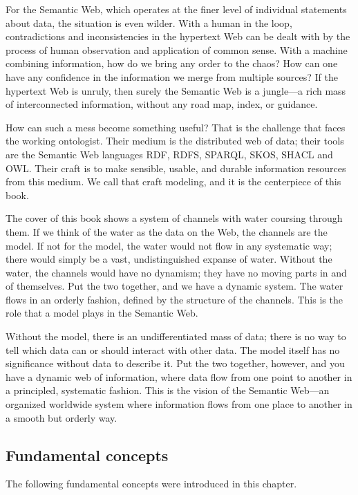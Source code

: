 For the Semantic Web, which operates at the finer level of individual
statements about data, the situation is even wilder. With a human in the
loop, contradictions and inconsistencies in the hypertext Web can be
dealt with by the process of human observation and application of common
sense. With a machine combining information, how do we bring any order
to the chaos? How can one have any confidence in the information we
merge from multiple sources? If the hypertext Web is unruly, then surely
the Semantic Web is a jungle---a rich mass of interconnected
information, without any road map, index, or guidance.

How can such a mess become something useful? That is the challenge that
faces the working ontologist. Their medium is the distributed web of
data; their tools are the Semantic Web languages RDF, RDFS, SPARQL,
SKOS, SHACL and OWL. Their craft is to make sensible, usable, and
durable information resources from this medium. We call that craft
modeling, and it is the centerpiece of this book.

The cover of this book shows a system of channels with water coursing
through them. If we think of the water as the data on the Web, the
channels are the model. If not for the model, the water would not flow
in any systematic way; there would simply be a vast, undistinguished
expanse of water. Without the water, the channels would have no
dynamism; they have no moving parts in and of themselves. Put the two
together, and we have a dynamic system. The water flows in an orderly
fashion, defined by the structure of the channels. This is the role that
a model plays in the Semantic Web.

Without the model, there is an undifferentiated mass of data; there is
no way to tell which data can or should interact with other data. The
model itself has no significance without data to describe it. Put the
two together, however, and you have a dynamic web of information, where
data flow from one point to another in a principled, systematic fashion.
This is the vision of the Semantic Web---an organized worldwide system
where information flows from one place to another in a smooth but
orderly way.

\subsection{Fundamental concepts}

The following fundamental concepts were introduced in this chapter.

